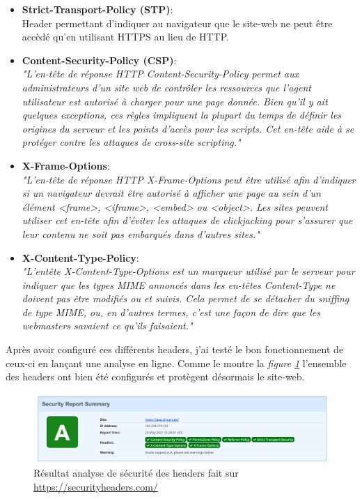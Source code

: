 \begin{itemize}
  \item \textbf{Strict-Transport-Policy (STP)}: \\ Header permettant d'indiquer au navigateur que le site-web ne peut être accèdé qu'en utilisant HTTPS au lieu de HTTP. \\
  
  \item \textbf{Content-Security-Policy (CSP)}: \\ \textit{"L'en-tête de réponse HTTP Content-Security-Policy permet aux administrateurs d'un site web de contrôler les ressources que l'agent utilisateur est autorisé à charger pour une page donnée. Bien qu'il y ait quelques exceptions, ces règles impliquent la plupart du temps de définir les origines du serveur et les points d'accès pour les scripts. Cet en-tête aide à se protéger contre les attaques de cross-site scripting."}\cite{CSP} \\

  \item \textbf{X-Frame-Options}: \\ \textit{"L'en-tête de réponse HTTP X-Frame-Options peut être utilisé afin d'indiquer si un navigateur devrait être autorisé à afficher une page au sein d'un élément <frame>, <iframe>, <embed> ou <object>. Les sites peuvent utiliser cet en-tête afin d'éviter les attaques de clickjacking pour s'assurer que leur contenu ne soit pas embarqués dans d'autres sites."}\cite{X-Frame} \\

  \item \textbf{X-Content-Type-Policy}: \\ \textit{"L'entête X-Content-Type-Options est un marqueur utilisé par le serveur pour indiquer que les types MIME annoncés dans les en-têtes Content-Type ne doivent pas être modifiés ou et suivis. Cela permet de se détacher du sniffing de type MIME, ou, en d'autres termes, c'est une façon de dire que les webmasters savaient ce qu'ils faisaient."}\cite{X-Content}
\end{itemize}

\newpara

Après avoir configuré ces différents headers, j'ai testé le bon fonctionnement de ceux-ci en lançant une analyse en ligne. Comme le montre la \textit{figure \ref{Headers}} l'ensemble des headers ont bien été configurés et protègent désormais le site-web. 

\begin{figure}[H]
  \centering
  \includegraphics[width=\linewidth]{img/securityHeaders.png}
  \caption{Résultat analyse de sécurité des headers fait sur \url{https://securityheaders.com/}}
  \label{Headers}
\end{figure}

